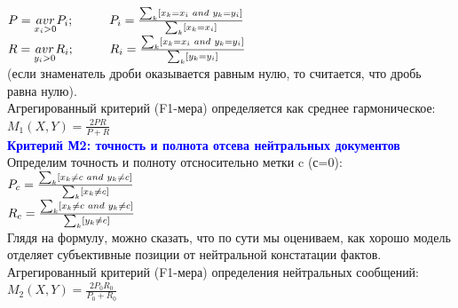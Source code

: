 \documentclass{article}
\begin{document}
\hspace{4cm}$P =  \underset{x_i>0}{avr}P_i; \hspace{1cm} P_i = \frac{\sum_{k} [x_k=x_i \hspace{0.1cm} and \hspace{0.1cm} y_k=y_i]}{\sum_{k} [x_k=x_i]}$\\

\hspace{3.5cm}$R = \underset{y_i>0}{avr}R_i; \hspace{1cm} R_i = \frac{\sum_{k} [x_k=x_i \hspace{0.1cm} and \hspace{0.1cm} y_k=y_i]}{\sum_{k} [y_k=y_i]}$\\

(если знаменатель дроби оказывается равным нулю, то считается, что дробь равна нулю).\\
Агрегированный критерий (F1-мера) определяется как среднее гармоническое:\\ 

\hspace{5cm}$M_1(X, Y) = \frac{2PR}{P+R}$\\

\textbf{\textcolor{blue}{Критерий М2: точность и полнота отсева нейтральных документов}}\\
Определим точность и полноту отсносительно метки c (с=0):\\

\hspace{5cm}$P_c = \frac{\sum_{k} [x_k \neq c \hspace{0.1cm} and \hspace{0.1cm} y_k \neq c]}{\sum_{k} [x_k \neq c]}$\\

\hspace{5cm}$R_c = \frac{\sum_{k} [x_k \neq c \hspace{0.1cm} and \hspace{0.1cm} y_k \neq c]}{\sum_{k} [y_k \neq c]}$\\

Глядя на формулу, можно сказать, что по сути мы оцениваем, как хорошо модель отделяет субъективные позиции от нейтральной констатации фактов.
Агрегированный критерий (F1-мера) определения нейтральных сообщений:\\ 

\hspace{5cm}$M_2(X, Y) = \frac{2P_0R_0}{P_0+R_0}$\\
\end{document}
